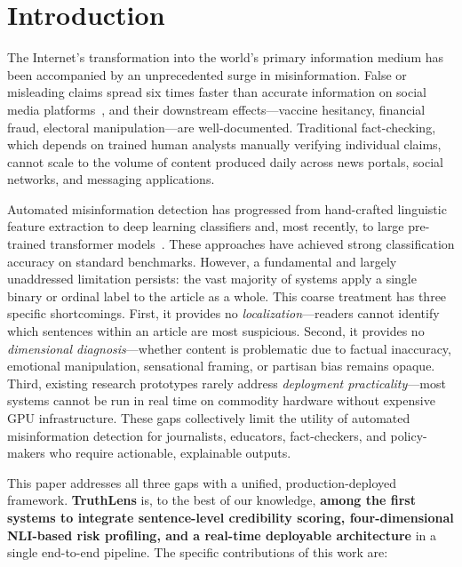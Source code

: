 \documentclass[journal]{IEEEtran}
\begin{document}
\section{Introduction}
\label{sec:intro}

The Internet's transformation into the world's primary information medium has been
accompanied by an unprecedented surge in misinformation. False or misleading claims spread
six times faster than accurate information on social media platforms~\cite{vosoughi2018spread},
and their downstream effects—vaccine hesitancy, financial fraud, electoral manipulation—are
well-documented. Traditional fact-checking, which depends on trained human analysts manually
verifying individual claims, cannot scale to the volume of content produced daily across news
portals, social networks, and messaging applications.

Automated misinformation detection has progressed from hand-crafted linguistic feature
extraction to deep learning classifiers and, most recently, to large pre-trained transformer
models~\cite{zhou2020survey, devlin2019bert, liu2019roberta}. These approaches have achieved
strong classification accuracy on standard benchmarks. However, a fundamental and largely
unaddressed limitation persists: the vast majority of systems apply a single binary or ordinal
label to the article as a whole. This coarse treatment has three specific shortcomings.
First, it provides no \textit{localization}—readers cannot identify which sentences within an
article are most suspicious. Second, it provides no \textit{dimensional diagnosis}—whether
content is problematic due to factual inaccuracy, emotional manipulation, sensational framing,
or partisan bias remains opaque. Third, existing research prototypes rarely address
\textit{deployment practicality}—most systems cannot be run in real time on commodity
hardware without expensive GPU infrastructure. These gaps collectively limit the utility of
automated misinformation detection for journalists, educators, fact-checkers, and
policy-makers who require actionable, explainable outputs.

This paper addresses all three gaps with a unified, production-deployed framework.
\textbf{TruthLens} is, to the best of our knowledge, \textbf{among the first systems to
integrate sentence-level credibility scoring, four-dimensional NLI-based risk profiling,
and a real-time deployable architecture} in a single end-to-end pipeline. The specific
contributions of this work are:
\end{document}
